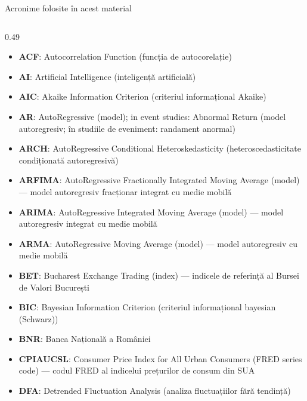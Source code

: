 {
\begin{frame}[noframenumbering]
    \titlepage
\end{frame}
}
\begin{frame}{Acronime folosite în acest material}
\begin{columns}[T]
\begin{column}{0.49\textwidth}
\begin{itemize}\setlength{\itemsep}{0pt}
    \item \textbf{ACF}: Autocorrelation Function (funcția de autocorelație)
    \item \textbf{AI}: Artificial Intelligence (inteligență artificială)
    \item \textbf{AIC}: Akaike Information Criterion (criteriul informațional Akaike)
    \item \textbf{AR}: AutoRegressive (model); in event studies: Abnormal Return (model autoregresiv; în studiile de eveniment: randament anormal)
    \item \textbf{ARCH}: AutoRegressive Conditional Heteroskedasticity (heteroscedasticitate condiționată autoregresivă)
    \item \textbf{ARFIMA}: AutoRegressive Fractionally Integrated Moving Average (model) — model autoregresiv fracționar integrat cu medie mobilă
    \item \textbf{ARIMA}: AutoRegressive Integrated Moving Average (model) — model autoregresiv integrat cu medie mobilă
    \item \textbf{ARMA}: AutoRegressive Moving Average (model) — model autoregresiv cu medie mobilă
    \item \textbf{BET}: Bucharest Exchange Trading (index) — indicele de referință al Bursei de Valori București
    \item \textbf{BIC}: Bayesian Information Criterion (criteriul informațional bayesian (Schwarz))
    \item \textbf{BNR}: Banca Națională a României
    \item \textbf{CPIAUCSL}: Consumer Price Index for All Urban Consumers (FRED series code) — codul FRED al indicelui prețurilor de consum din SUA
    \item \textbf{DFA}: Detrended Fluctuation Analysis (analiza fluctuațiilor fără tendință)
\end{itemize}
\end{column}

\end{columns}
\end{frame}

